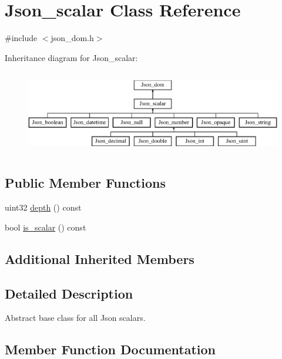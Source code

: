 \hypertarget{classJson__scalar}{}\section{Json\+\_\+scalar Class Reference}
\label{classJson__scalar}


{\ttfamily \#include $<$json\+\_\+dom.\+h$>$}

Inheritance diagram for Json\+\_\+scalar\+:\begin{figure}[H]
\begin{center}
\leavevmode
\includegraphics[height=3.733333cm]{classJson__scalar}
\end{center}
\end{figure}
\subsection*{Public Member Functions}
\begin{DoxyCompactItemize}
\item 
uint32 \mbox{\hyperlink{classJson__scalar_aab92f03cf346f3239138e488a13254e7}{depth}} () const
\item 
bool \mbox{\hyperlink{classJson__scalar_a521c56a686010b1d60f612d1c376aa85}{is\+\_\+scalar}} () const
\end{DoxyCompactItemize}
\subsection*{Additional Inherited Members}


\subsection{Detailed Description}
Abstract base class for all Json scalars. 

\subsection{Member Function Documentation}
\mbox{\label{classJson__scalar_aab92f03cf346f3239138e488a13254e7}} 
